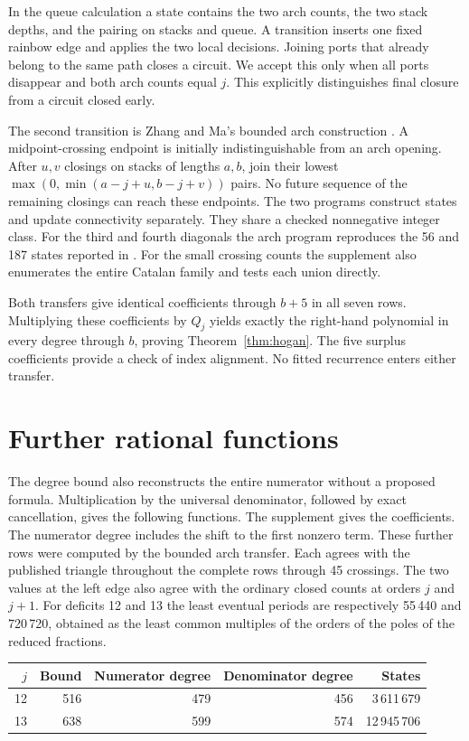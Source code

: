 In the queue calculation a state contains the two arch counts, the two stack depths, and the pairing on stacks and queue. A transition inserts one fixed rainbow edge and applies the two local decisions. Joining ports that already belong to the same path closes a circuit. We accept this only when all ports disappear and both arch counts equal \(j\). This explicitly distinguishes final closure from a circuit closed early.

The second transition is Zhang and Ma's bounded arch construction \cite[Lemma~1]{zm}. A midpoint-crossing endpoint is initially indistinguishable from an arch opening. After \(u,v\) closings on stacks of lengths \(a,b\), join their lowest
\(\max(0,\min(a-j+u,b-j+v))\) pairs. No future sequence of the remaining closings can reach these endpoints. The two programs construct states and update connectivity separately. They share a checked nonnegative integer class. For the third and fourth diagonals the arch program reproduces the 56 and 187 states reported in \cite{zm}. For the small crossing counts the supplement also enumerates the entire Catalan family and tests each union directly.

Both transfers give identical coefficients through \(b+5\) in all seven rows. Multiplying these coefficients by \(Q_j\) yields exactly the right-hand polynomial in every degree through \(b\), proving Theorem~\ref{thm:hogan}. The five surplus coefficients provide a check of index alignment. No fitted recurrence enters either transfer.

\section{Further rational functions}
The degree bound also reconstructs the entire numerator without a proposed formula. Multiplication by the universal denominator, followed by exact cancellation, gives the following functions. The supplement gives the coefficients. The numerator degree includes the shift to the first nonzero term. These further rows were computed by the bounded arch transfer. Each agrees with the published triangle throughout the complete rows through 45 crossings. The two values at the left edge also agree with the ordinary closed counts at orders \(j\) and \(j+1\). For deficits 12 and 13 the least eventual periods are respectively 55\,440 and 720\,720, obtained as the least common multiples of the orders of the poles of the reduced fractions.
\begin{center}\begin{tabular}{rrrrr}\toprule \(j\)&Bound&Numerator degree&Denominator degree&States\\\midrule
12 & 516 & 479 & 456 & 3\,611\,679\\
13 & 638 & 599 & 574 & 12\,945\,706\\
\bottomrule\end{tabular}\end{center}

